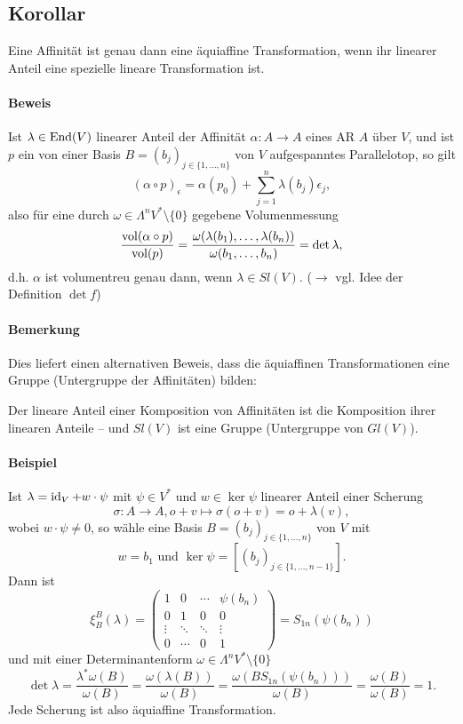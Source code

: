 \subsection{Korollar}
	Eine Affinität ist genau dann eine äquiaffine Transformation, wenn ihr linearer Anteil eine spezielle lineare Transformation ist.
\paragraph{Beweis}
	Ist $ \lambda \in \operatorname{End}(V) $ linearer Anteil der Affinität $ \alpha:A\to A $ eines AR $ A  $ über $ V $, und ist $ p $ ein von einer Basis $ B=(b_j)_{j\in \{1,\dots,n\}} $ von $ V $ aufgespanntes Parallelotop, so gilt
		\[ (\alpha\circ p)_\epsilon = \alpha(p_0)+\sum_{j=1}^{n}\lambda(b_j)\epsilon_j, \]
	also für eine durch $ \omega\in \Lambda^nV^*\setminus \{0\} $ gegebene Volumenmessung
		\[ \frac{\operatorname{vol}(\alpha\circ p)}{\operatorname{vol}(p)} = \frac{\omega(\lambda(b_1),\dots,\lambda(b_n))}{\omega(b_1,\dots,b_n)}=\det \lambda, \]
	d.h. $ \alpha $ ist volumentreu genau dann, wenn $ \lambda \in Sl(V) $. ($ \rightarrow $ vgl. Idee der Definition $ \det f $)
\paragraph{Bemerkung}
	Dies liefert einen alternativen Beweis, dass die äquiaffinen Transformationen eine Gruppe (Untergruppe der Affinitäten) bilden:
	
	Der lineare Anteil einer Komposition von Affinitäten ist die Komposition ihrer linearen Anteile -- und $ Sl(V) $ ist eine Gruppe (Untergruppe von $ Gl(V) $).
\paragraph{Beispiel}
	Ist $ \lambda = \operatorname{id}_V + w\cdot \psi $ mit $ \psi\in V^* $ und $ w\in \ker \psi $ linearer Anteil einer Scherung
		\[ \sigma:A\to A, o+v\mapsto \sigma(o+v) = o+\lambda(v), \]
	wobei $ w\cdot\psi\neq 0 $, so wähle eine Basis $ B = (b_j)_{j\in\{1,\dots,n\}}$ von $ V $ mit
		\[ w=b_1 \text{ und }  \ker \psi = [(b_j)_{j\in \{1,\dots,n-1\}}]. \]
	Dann ist
		\[ \xi_B^B(\lambda) =
			\begin{pmatrix}
				1 & 0 & \cdots & \psi(b_n)\\
				0 & 1 & 0 & 0 \\
				\vdots &\ddots & \ddots & \vdots\\
				0 &\cdots& 0 & 1
			\end{pmatrix} = S_{1n}(\psi(b_n)) \]
	und mit einer Determinantenform $ \omega\in \Lambda^nV^*\setminus\{0\} $
		\[ \det \lambda = \frac{\lambda^*\omega(B)}{\omega(B)} = \frac{\omega(\lambda(B))}{\omega(B)} = \frac{\omega(BS_{1n}(\psi(b_n)))}{\omega(B)} = \frac{\omega(B)}{\omega(B)} = 1.\]
	Jede Scherung ist also äquiaffine Transformation.
